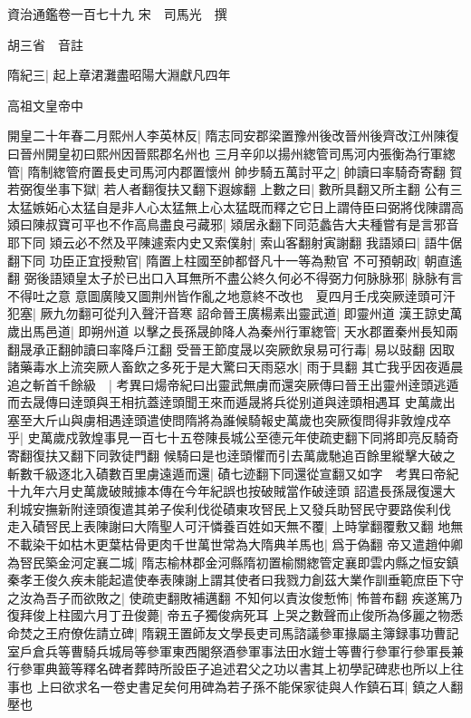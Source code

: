 資治通鑑卷一百七十九
宋　司馬光　撰

胡三省　音註

隋紀三|{
	起上章涒灘盡昭陽大淵獻凡四年}


高祖文皇帝中

開皇二十年春二月熙州人李英林反|{
	隋志同安郡梁置豫州後改晉州後齊改江州陳復曰晉州開皇初曰熙州因晉熙郡名州也}
三月辛卯以揚州緫管司馬河内張衡為行軍緫管|{
	隋制緫管府置長史司馬河内郡置懷州}
帥步騎五萬討平之|{
	帥讀曰率騎奇寄翻}
賀若弼復坐事下獄|{
	若人者翻復扶又翻下遐嫁翻}
上數之曰|{
	數所具翻又所主翻}
公有三太猛嫉妬心太猛自是非人心太猛無上心太猛既而釋之它日上謂侍臣曰弼將伐陳謂高熲曰陳叔寶可平也不作高鳥盡良弓藏邪|{
	熲居永翻下同范蠡告大夫種嘗有是言邪音耶下同}
熲云必不然及平陳遽索内史又索僕射|{
	索山客翻射寅謝翻}
我語熲曰|{
	語牛倨翻下同}
功臣正宜授勲官|{
	隋置上柱國至帥都督凡十一等為勲官}
不可預朝政|{
	朝直遙翻}
弼後語熲皇太子於已出口入耳無所不盡公終久何必不得弼力何脉脉邪|{
	脉脉有言不得吐之意}
意圖廣陵又圖荆州皆作亂之地意終不改也　夏四月壬戌突厥逹頭可汗犯塞|{
	厥九勿翻可從刋入聲汗音寒}
詔命晉王廣楊素出靈武道|{
	即靈州道}
漢王諒史萬歲出馬邑道|{
	即朔州道}
以擊之長孫晟帥降人為秦州行軍緫管|{
	天水郡置秦州長知兩翻晟承正翻帥讀曰率降戶江翻}
受晉王節度晟以突厥飲泉易可行毒|{
	易以䜴翻}
因取諸藥毒水上流突厥人畜飲之多死于是大驚曰天雨惡水|{
	雨于具翻}
其亡我乎因夜遁晨追之斬首千餘級　|{
	考異曰煬帝紀曰出靈武無虜而還突厥傳曰晉王出靈州逹頭逃遁而去晟傳曰逹頭與王相抗蓋逹頭聞王來而遁晟將兵從别道與逹頭相遇耳}
史萬歲出塞至大斤山與虜相遇逹頭遣使問隋將為誰候騎報史萬歲也突厥復問得非敦煌戍卒乎|{
	史萬歲戍敦煌事見一百七十五卷陳長城公至德元年使疏吏翻下同將即亮反騎奇寄翻復扶又翻下同敦徒門翻}
候騎曰是也逹頭懼而引去萬歲馳追百餘里縱擊大破之斬數千級逐北入磧數百里虜遠遁而還|{
	磧七迹翻下同還從宣翻又如字　考異曰帝紀十九年六月史萬歲破賊據本傳在今年紀誤也按破賊當作破逹頭}
詔遣長孫晟復還大利城安撫新附逹頭復遣其弟子俟利伐從磧東攻唘民上又發兵助唘民守要路俟利伐走入磧唘民上表陳謝曰大隋聖人可汗憐養百姓如天無不覆|{
	上時掌翻覆敷又翻}
地無不載染干如枯木更葉枯骨更肉千世萬世常為大隋典羊馬也|{
	爲于偽翻}
帝又遣趙仲卿為唘民築金河定襄二城|{
	隋志榆林郡金河縣隋初置榆關緫管定襄即雲内縣之恒安鎮}
秦孝王俊久疾未能起遣使奉表陳謝上謂其使者曰我戮力創茲大業作訓垂範庶臣下守之汝為吾子而欲敗之|{
	使疏吏翻敗補邁翻}
不知何以責汝俊慙怖|{
	怖普布翻}
疾遂篤乃復拜俊上柱國六月丁丑俊薨|{
	帝五子獨俊病死耳}
上哭之數聲而止俊所為侈麗之物悉命焚之王府僚佐請立碑|{
	隋親王置師友文學長吏司馬諮議參軍掾屬主簿録事功曹記室戶倉兵等曹騎兵城局等參軍東西閣祭酒參軍事法田水鎧士等曹行參軍行參軍長兼行參軍典籖等釋名碑者葬時所設臣子追述君父之功以書其上初學記碑悲也所以上往事也}
上曰欲求名一卷史書足矣何用碑為若子孫不能保家徒與人作鎮石耳|{
	鎮之人翻壓也}
